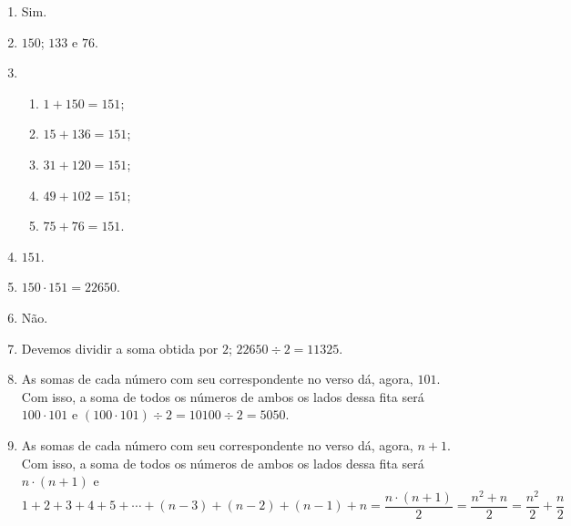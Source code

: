 \documentclass[10 pt,usenames,dvipsnames, oneside]{article}
\begin{document}
\ifdefined\prof
\begin{solucao}

\begin{enumerate}
\item {} 
Sim.

\item {} 
\(150\); \(133\) e \(76\).

\item {} 
\begin{enumerate}[label=\Roman*)]
\item \(1+150=151\);

\item \(15+136=151\);

\item \(31+120=151\);

\item \(49+102=151\);

\item \(75+76=151\).
\end{enumerate}

\item {} 
\(151\).

\item {} 
\(150 \cdot 151=22650\).

\item {} 
Não.

\item {} 
Devemos dividir a soma obtida por \(2\); \(22650 \div 2=11325\).

\item {} 
As somas de cada número com seu correspondente no verso dá, agora, \(101\). Com isso, a soma de todos os números de ambos os lados dessa fita será \(100 \cdot 101\) e \((100 \cdot 101) \div 2 = 10100 \div 2 = 5050\).

\item {} 
As somas de cada número com seu correspondente no verso dá, agora, \(n+1\). Com isso, a soma de todos os números de ambos os lados dessa fita será \(n \cdot (n+1)\) e
\begin{equation*}
1+2+3+4+5+ \cdots +(n-3)+(n-2)+(n-1)+n=\frac{n \cdot (n+1)}{2} = \frac{n^2 + n}{2}=\frac{n^2}{2} + \frac{n}{2}
\end{equation*}

\end{enumerate}

\end{solucao}
\fi
\end{document}
